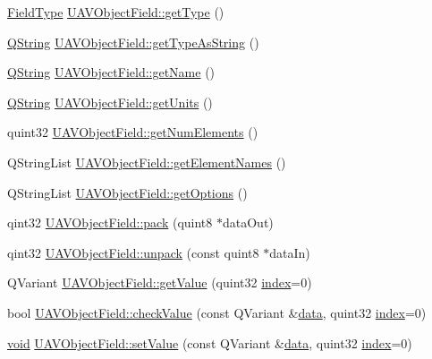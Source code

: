\begin{DoxyCompactItemize}
\item 
\hyperlink{uavobjectparser_8h_aa01498a3ceb2fa74dc9536c16caef1da}{Field\-Type} \hyperlink{group___u_a_v_objects_plugin_gad306893ea1f5623eaa970e35ffa7d901}{U\-A\-V\-Object\-Field\-::get\-Type} ()
\item 
\hyperlink{group___u_a_v_objects_plugin_gab9d252f49c333c94a72f97ce3105a32d}{Q\-String} \hyperlink{group___u_a_v_objects_plugin_ga53cf1cae78bc619ca91faffedacfc61f}{U\-A\-V\-Object\-Field\-::get\-Type\-As\-String} ()
\item 
\hyperlink{group___u_a_v_objects_plugin_gab9d252f49c333c94a72f97ce3105a32d}{Q\-String} \hyperlink{group___u_a_v_objects_plugin_ga86c7c87ecda0ed11b8a2f125b0741bab}{U\-A\-V\-Object\-Field\-::get\-Name} ()
\item 
\hyperlink{group___u_a_v_objects_plugin_gab9d252f49c333c94a72f97ce3105a32d}{Q\-String} \hyperlink{group___u_a_v_objects_plugin_gabb1e371d4c3d91f70a172d7827db2da8}{U\-A\-V\-Object\-Field\-::get\-Units} ()
\item 
quint32 \hyperlink{group___u_a_v_objects_plugin_ga6c929356a6e66fd7c56e9d547e67ef7c}{U\-A\-V\-Object\-Field\-::get\-Num\-Elements} ()
\item 
Q\-String\-List \hyperlink{group___u_a_v_objects_plugin_ga5686a3cb18234741a84666023acf4e8e}{U\-A\-V\-Object\-Field\-::get\-Element\-Names} ()
\item 
Q\-String\-List \hyperlink{group___u_a_v_objects_plugin_ga23e324a921bdf20972f940b4497a2c21}{U\-A\-V\-Object\-Field\-::get\-Options} ()
\item 
qint32 \hyperlink{group___u_a_v_objects_plugin_gabfadd471718e9a6bdb5e106fb99574d9}{U\-A\-V\-Object\-Field\-::pack} (quint8 $\ast$data\-Out)
\item 
qint32 \hyperlink{group___u_a_v_objects_plugin_ga8223d7b605648a98c12d00ae43febd5c}{U\-A\-V\-Object\-Field\-::unpack} (const quint8 $\ast$data\-In)
\item 
Q\-Variant \hyperlink{group___u_a_v_objects_plugin_ga60a1c56703ea2c28f76d1eaf05554f5e}{U\-A\-V\-Object\-Field\-::get\-Value} (quint32 \hyperlink{glext_8h_ab47dd9958bcadea08866b42bf358e95e}{index}=0)
\item 
bool \hyperlink{group___u_a_v_objects_plugin_ga8aed4e68eb0697d4776a103bfe5aa059}{U\-A\-V\-Object\-Field\-::check\-Value} (const Q\-Variant \&\hyperlink{glext_8h_a8850df0785e6fbcc2351af3b686b8c7a}{data}, quint32 \hyperlink{glext_8h_ab47dd9958bcadea08866b42bf358e95e}{index}=0)
\item 
\hyperlink{group___u_a_v_objects_plugin_ga444cf2ff3f0ecbe028adce838d373f5c}{void} \hyperlink{group___u_a_v_objects_plugin_gab647538e1956252e12841c42a54106c7}{U\-A\-V\-Object\-Field\-::set\-Value} (const Q\-Variant \&\hyperlink{glext_8h_a8850df0785e6fbcc2351af3b686b8c7a}{data}, quint32 \hyperlink{glext_8h_ab47dd9958bcadea08866b42bf358e95e}{index}=0)

\end{DoxyCompactItemize}
